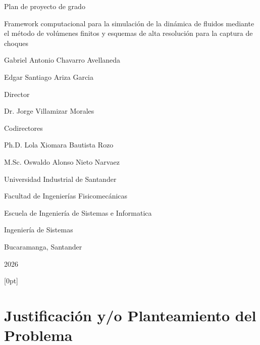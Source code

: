 \documentclass[11pt,openany]{book}
\renewcommand{\headrulewidth}{0pt}
\renewcommand{\headrulewidth}{0pt}%
\renewcommand{\footrulewidth}{0pt}%
\begin{document}
\begin{titlepage}
    \thispagestyle{fancy}
    \lhead{\leftmark} \chead{} \rhead{\thepage} %
    \lfoot{}{} \cfoot{} \rfoot{}
    \centering
    {\large Plan de proyecto de grado \par}
    \vfill
    {\large Framework computacional para la simulación de la dinámica de fluidos mediante el método de volúmenes finitos y esquemas de alta resolución para la captura de choques \par}
    \vfill
    {\large Gabriel Antonio Chavarro Avellaneda \par}
    {\large Edgar Santiago Ariza Garcia \par}
    \vfill
    {\large Director \par}
    {\large Dr. Jorge Villamizar Morales \par}
    \vfill
    {\large Codirectores \par}
    {\large Ph.D. Lola Xiomara Bautista Rozo \par}
    {\large M.Sc. Oswaldo Alonso Nieto Narvaez \par}
    \vfill 
    {\large Universidad Industrial de Santander \par}
    {\large Facultad de Ingenierías Fisicomecánicas \par}
    {\large Escuela de Ingeniería de Sistemas e Informatica\par}
    {\large Ingeniería de Sistemas\par}
    {\large Bucaramanga, Santander \par}
    {\large 2026 \par}
\end{titlepage}
\thispagestyle{empty}

\newpage



\renewcommand{\contentsname}{Contenido}
\doublespacing
{} [0pt]{\addvspace{1pc}\bfseries}{}{}{\hfill\contentspage}
\tableofcontents
\singlespacing

\newpage

\doublespacing

\chapter{Justificación y/o Planteamiento del Problema}

\thispagestyle{fancy}
\fancyhf{}
   \chead{} \rhead{\thepage}
    \lfoot{}{} \cfoot{} \rfoot{}
    \renewcommand{\headrulewidth}{0pt}
  \renewcommand{\footrulewidth}{0pt}
\end{document}
